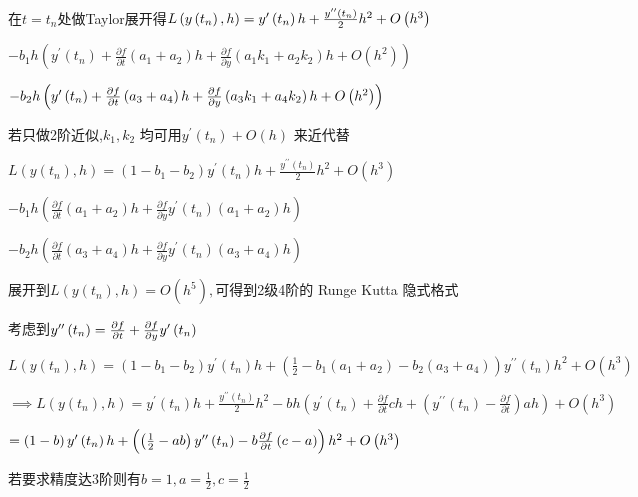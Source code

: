\documentclass{article}
\begin{document}
在$t=t_{n}$处做Taylor展开得$L\left(
y\left( t_{n}\right) ,h\right) =y^{\prime }\left( t_{n}\right) h+\frac{%
y^{\prime \prime }\left( t_{n}\right) }{2}h^{2}+O\left( h^{3}\right) $

$-b_{1}h\left( y^{\prime }\left( t_{n}\right) +\frac{\partial f}{\partial t}%
\left( a_{1}+a_{2}\right) h+\frac{\partial f}{\partial y}\left(
a_{1}k_{1}+a_{2}k_{2}\right) h+O\left( h^{2}\right) \right) $

\bigskip $-b_{2}h\left( y^{\prime }\left( t_{n}\right) +\frac{\partial f}{%
\partial t}\left( a_{3}+a_{4}\right) h+\frac{\partial f}{\partial y}\left(
a_{3}k_{1}+a_{4}k_{2}\right) h+O\left( h^{2}\right) \right) $

\bigskip 若只做2阶近似,$k_{1},k_{2}$%
均可用$y^{\prime }\left( t_{n}\right) +O\left( h\right) $%
来近代替

$L\left( y\left( t_{n}\right) ,h\right) =\left( 1-b_{1}-b_{2}\right)
y^{\prime }\left( t_{n}\right) h+\frac{y^{\prime \prime }\left( t_{n}\right) 
}{2}h^{2}+O\left( h^{3}\right) $

$-b_{1}h\left( \frac{\partial f}{\partial t}\left( a_{1}+a_{2}\right) h+%
\frac{\partial f}{\partial y}y^{\prime }\left( t_{n}\right) \left(
a_{1}+a_{2}\right) h\right) $

\bigskip $-b_{2}h\left( \frac{\partial f}{\partial t}\left(
a_{3}+a_{4}\right) h+\frac{\partial f}{\partial y}y^{\prime }\left(
t_{n}\right) \left( a_{3}+a_{4}\right) h\right) $

\bigskip 展开到$L\left( y\left( t_{n}\right) ,h\right)
=O\left( h^{5}\right) ,$可得到2级4阶的%
Runge Kutta 隐式格式


考虑到$y^{\prime \prime }\left( t_{n}\right) =\frac{%
\partial f}{\partial t}+\frac{\partial f}{\partial y}y^{\prime }\left(
t_{n}\right) $

$L\left( y\left( t_{n}\right) ,h\right) =\left( 1-b_{1}-b_{2}\right)
y^{\prime }\left( t_{n}\right) h+\left( \frac{1}{2}-b_{1}\left(
a_{1}+a_{2}\right) -b_{2}\left( a_{3}+a_{4}\right) \right) y^{\prime \prime
}\left( t_{n}\right) h^{2}+O\left( h^{3}\right) $

$\implies L\left( y\left( t_{n}\right) ,h\right) =y^{\prime }\left(
t_{n}\right) h+\frac{y^{\prime \prime }\left( t_{n}\right) }{2}%
h^{2}-bh\left( y^{\prime }\left( t_{n}\right) +\frac{\partial f}{\partial t}%
ch+\left( y^{\prime \prime }\left( t_{n}\right) -\frac{\partial f}{\partial t%
}\right) ah\right) +O\left( h^{3}\right) $

$=\left( 1-b\right) y^{\prime }\left( t_{n}\right) h+\left( \left( \frac{1}{2%
}-ab\right) y^{\prime \prime }\left( t_{n}\right) -b\frac{\partial f}{%
\partial t}\left( c-a\right) \right) h^{2}+O\left( h^{3}\right) $

若要求精度达3阶则有$%
b=1,a=\frac{1}{2},c=\frac{1}{2}$
\end{document}

